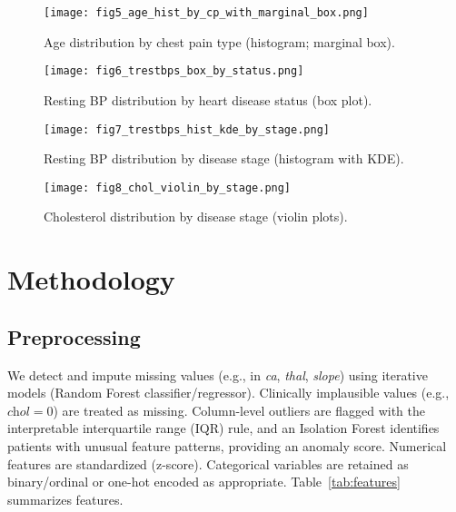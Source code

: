 \documentclass[conference]{IEEEtran}
\begin{document}
\begin{figure}[!t]
  \centering
  \texttt{[image: fig5\_age\_hist\_by\_cp\_with\_marginal\_box.png]}
  \caption{Age distribution by chest pain type (histogram; marginal box).}
  \label{fig:agecp}
\end{figure}

\begin{figure}[!t]
  \centering
  \texttt{[image: fig6\_trestbps\_box\_by\_status.png]}
  \caption{Resting BP distribution by heart disease status (box plot).}
  \label{fig:bpbox}
\end{figure}

\begin{figure}[!t]
  \centering
  \texttt{[image: fig7\_trestbps\_hist\_kde\_by\_stage.png]}
  \caption{Resting BP distribution by disease stage (histogram with KDE).}
  \label{fig:bphist}
\end{figure}

\begin{figure}[!t]
  \centering
  \texttt{[image: fig8\_chol\_violin\_by\_stage.png]}
  \caption{Cholesterol distribution by disease stage (violin plots).}
  \label{fig:cholvio}
\end{figure}

\section{Methodology}
\subsection{Preprocessing}
We detect and impute missing values (e.g., in \textit{ca}, \textit{thal}, \textit{slope}) using iterative models (Random Forest classifier/regressor). Clinically implausible values (e.g., \(\textit{chol}=0\)) are treated as missing. Column-level outliers are flagged with the interpretable interquartile range (IQR) rule, and an Isolation Forest identifies patients with unusual feature patterns, providing an anomaly score. Numerical features are standardized (z-score). Categorical variables are retained as binary/ordinal or one-hot encoded as appropriate. Table~\ref{tab:features} summarizes features.
\end{document}
